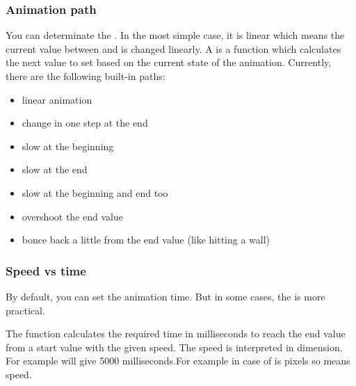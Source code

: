 \documentclass[letterpaper,10pt,english]{sphinxmanual}
\begin{document}
\subsubsection{Animation path}
\label{\detokenize{overview/animations:animation-path}}
You can determinate the . In the most simple case, it is linear which means the current value between  and   is changed linearly.
A  is a function which calculates the next value to set based on the current state of the animation. Currently, there are the following built-in paths:
\begin{itemize}
\item {} 
 linear animation

\item {} 
 change in one step at the end

\item {} 
 slow at the beginning

\item {} 
 slow at the end

\item {} 
 slow at the beginning and end too

\item {} 
 overshoot the end value

\item {} 
 bonce back a little from the end value (like hitting a wall)

\end{itemize}


\subsubsection{Speed vs time}
\label{\detokenize{overview/animations:speed-vs-time}}
By default, you can set the animation time. But in some cases, the  is more practical.

The  function calculates the required time in milliseconds to reach the end value from a start value with the given speed.
The speed is interpreted in  dimension. For example  will give 5000 milliseconds.For example in case of   is pixels so  means  speed.
\end{document}
